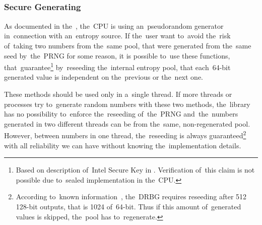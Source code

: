 \\


\\

\\

\\

\\

\\

\subsubsection{Secure Generating}\label{subsec:api:secure}
\par{
As documented in the~, the~CPU is using an~pseudorandom generator in~connection with an~entropy source. If the~user want to~avoid the~risk of~taking two numbers from the~same pool, that were generated from the~same seed by~the~PRNG for some reason, it is possible to~use these functions, that~guarantee\footnote{Based on description of~Intel Secure Key in . Verification of~this claim is not possible due to~sealed implementation in the~CPU.} by~reseeding the~internal entropy pool, that each~64-bit generated value is independent on the~previous or the~next one. 
}

\par{
These methods should be used only in a~single thread. 
If more threads or processes try to~generate random numbers with these two methods, 
the~library has no possibility to~enforce the~reseeding of~the~PRNG and~the~numbers generated 
in two different threads can be from the~same, non-regenerated pool.
However, between numbers in one thread, 
the~reseeding is always guaranteed\footnote{According to~known information~\cite[sec.~2.4.2]{AnalysisOfDRNG}, the~DRBG requires reseeding after 512 128-bit outputs, that is 1024 of~64-bit. 
Thus if this amount of~generated values is skipped, the~pool has to~regenerate.} 
with all reliability we can have without knowing the~implementation details.
}



